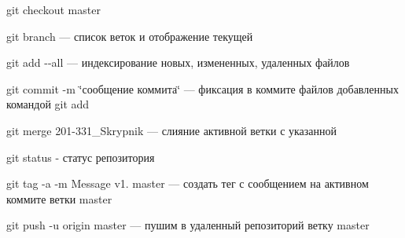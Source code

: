 
\begin{DoxyCode}{0}
\DoxyCodeLine{}
\DoxyCodeLine{\_\_\_}
\DoxyCodeLine{}

\end{DoxyCode}


{\ttfamily git checkout master} 


{\ttfamily git branch} — список веток и отображение текущей

{\ttfamily git add -\/-\/all} — индексирование новых, измененных, удаленных файлов

{\ttfamily git commit -\/m \char`\"{}сообщение коммита\char`\"{}} — фиксация в коммите файлов добавленных командой git add

{\ttfamily git merge 201-\/331\+\_\+\+Skrypnik} — слияние активной ветки с указанной

{\ttfamily git status} -\/ статус репозитория

{\ttfamily git tag -\/a -\/m \textquotesingle{}Message\textquotesingle{} v1. master} — создать тег с сообщением на активном коммите ветки master

{\ttfamily git push -\/u origin master} — пушим в удаленный репозиторий ветку master 
